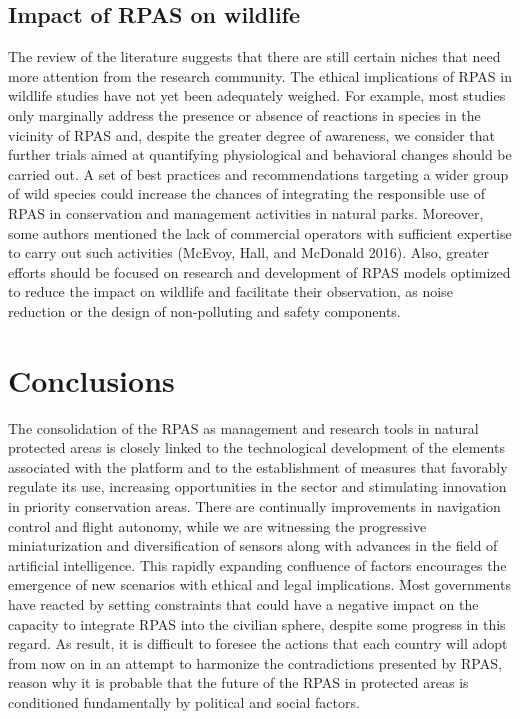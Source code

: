 \documentclass[]{interact}
\theoremstyle{plain}%
\theoremstyle{definition}
\theoremstyle{remark}
\begin{document}
\subsection{Impact of RPAS on
wildlife}\label{impact-of-rpas-on-wildlife-1}

The review of the literature suggests that there are still certain
niches that need more attention from the research community. The ethical
implications of RPAS in wildlife studies have not yet been adequately
weighed. For example, most studies only marginally address the presence
or absence of reactions in species in the vicinity of RPAS and, despite
the greater degree of awareness, we consider that further trials aimed
at quantifying physiological and behavioral changes should be carried
out. A set of best practices and recommendations targeting a wider group
of wild species could increase the chances of integrating the
responsible use of RPAS in conservation and management activities in
natural parks. Moreover, some authors mentioned the lack of commercial
operators with sufficient expertise to carry out such activities
(McEvoy, Hall, and McDonald 2016). Also, greater efforts should be
focused on research and development of RPAS models optimized to reduce
the impact on wildlife and facilitate their observation, as noise
reduction or the design of non-polluting and safety components.

\section{Conclusions}\label{conclusions}

The consolidation of the RPAS as management and research tools in
natural protected areas is closely linked to the technological
development of the elements associated with the platform and to the
establishment of measures that favorably regulate its use, increasing
opportunities in the sector and stimulating innovation in priority
conservation areas. There are continually improvements in navigation
control and flight autonomy, while we are witnessing the progressive
miniaturization and diversification of sensors along with advances in
the field of artificial intelligence. This rapidly expanding confluence
of factors encourages the emergence of new scenarios with ethical and
legal implications. Most governments have reacted by setting constraints
that could have a negative impact on the capacity to integrate RPAS into
the civilian sphere, despite some progress in this regard. As result, it
is difficult to foresee the actions that each country will adopt from
now on in an attempt to harmonize the contradictions presented by RPAS,
reason why it is probable that the future of the RPAS in protected areas
is conditioned fundamentally by political and social factors.
\end{document}
